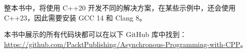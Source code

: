 
整本书中，将使用 C++20 开发不同的解决方案，在某些示例中，还会使用 C++23，因此需要安装 GCC 14 和 Clang 8。

本书中展示的所有代码块都可以在以下 GitHub 库中找到： \url{https://github.com/PacktPublishing/Asynchronous-Programming-with-CPP}。